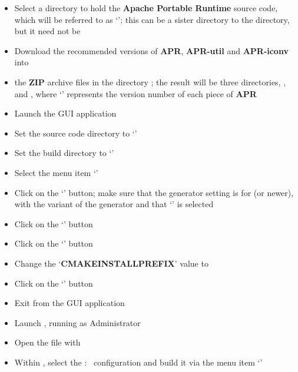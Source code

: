\begin{itemize}
\item Select a directory to hold the \textbf{Apache Portable Runtime} source code, which
will be referred to as `'; this can be a sister directory to the
 directory, but it need not be
\item\exSp{}Download the recommended versions of \textbf{APR}, \textbf{APR-util} and
\textbf{APR-iconv} into 
\item\exSp{} the \textbf{ZIP} archive files in the directory
; the result will be three directories, ,\\
 and , where `'
represents the version number of each piece of \textbf{APR}
\item Launch the  GUI application
\item\exSp{}Set the source code directory to `'
\item\exSp{}Set the build directory to `'
\item\exSp{}Select the menu item `'
\item\exSp{}Click on the `' button; make sure that the generator
setting is for  (or newer), with the  variant of
the generator and that `' is selected
\item\exSp{}Click on the `' button
\item\exSp{}Click on the `' button
\item\exSp{}Change the `\textbf{CMAKE\fUS{}INSTALL\fUS{}PREFIX}' value to
\item\exSp{}Click on the `' button
\item\exSp{}Exit from the  GUI application
\item\exSp{}Launch , running as Administrator
\item\exSp{}Open the file
 with 
\item\exSp{}Within , select the  :\ 
configuration and build it via the menu item
`'

\end{itemize}
